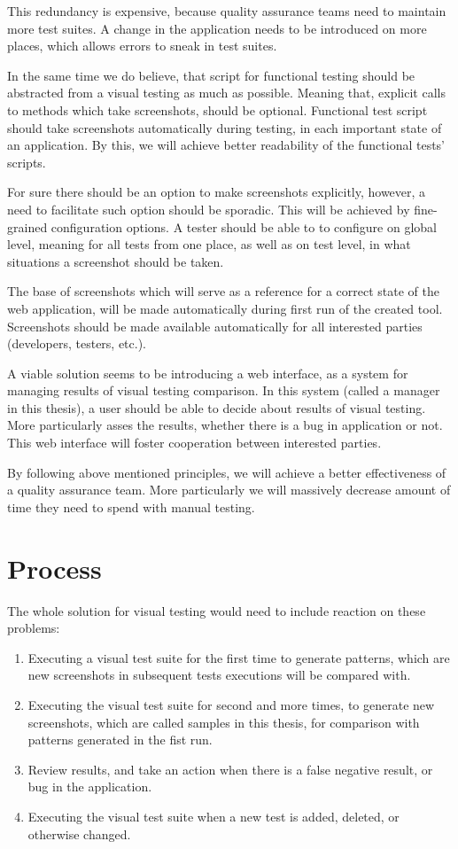 \documentclass[11pt,oneside,final]{fithesis2}
\begin{document}
  This redundancy is expensive, because quality assurance teams need to maintain more test suites. A change in the application needs to be introduced on more places, which allows errors to
  sneak in test suites.
  
  In the same time we do believe, that script for functional testing should be abstracted from a visual testing as much as possible. Meaning that, explicit calls to methods which 
  take screenshots, should be optional. Functional test script should take screenshots automatically during testing, in each important state of an application. By this, we will achieve better
  readability of the functional tests' scripts.
  
  For sure there should be an option to make screenshots explicitly, however, a need to facilitate such option should be sporadic. This will be achieved by fine-grained configuration options.
  A tester should be able to to configure on global level, meaning for all tests from one place, as well as on test level, in what situations a screenshot should be taken.
  
  The base of screenshots which will serve as a reference for a correct state of the web application, will be made automatically during first run of the created tool. 
  Screenshots should be made available automatically for all interested parties (developers, testers, etc.).
  
  A viable solution seems to be introducing a web interface, as a system for managing results of visual testing comparison. In this system (called a manager in this thesis), a user should be
  able to decide about results of visual testing. More particularly asses the results, whether there is a bug in application or not. 
  This web interface will foster cooperation between interested parties.
  
  By following above mentioned principles, we will achieve a better effectiveness of a quality assurance team. More particularly we will massively decrease amount of time they need to spend 
  with manual testing.
  
  \section{Process}
  \label{sec:process}
  The whole solution for visual testing would need to include reaction on these problems:
  \begin{enumerate}
   \item Executing a visual test suite for the first time to generate patterns, which are new screenshots in subsequent tests executions will be compared with.
   \item Executing the visual test suite for second and more times, to generate new screenshots, which are called samples in this thesis, for comparison with patterns generated in the fist run.
   \item Review results, and take an action when there is a false negative result, or bug in the application.
   \item Executing the visual test suite when a new test is added, deleted, or otherwise changed.
  \end{enumerate}
\end{document}
